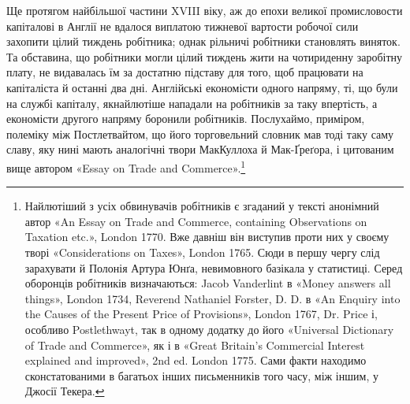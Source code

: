 Ще протягом найбільшої частини XVIII віку, аж до епохи
великої промисловости капіталові в Англії не вдалося виплатою
тижневої вартости робочої сили захопити цілий тиждень робітника;
однак рільничі робітники становлять виняток. Та обставина,
що робітники могли цілий тиждень жити на чотириденну
заробітну плату, не видавалась їм за достатню підставу для того,
щоб працювати на капіталіста й останні два дні. Англійські економісти
одного напряму, ті, що були на службі капіталу, якнайлютіше
нападали на робітників за таку впертість, а економісти
другого напряму боронили робітників. Послухаймо, приміром,
полеміку між Постлетвайтом, що його торговельний словник
мав тоді таку саму славу, яку нині мають аналогічні твори МакКуллоха
й Мак-Ґреґора, і цитованим вище автором «Essay
on Trade and Commerce».\footnote{
Найлютіший з усіх обвинувачів робітників є згаданий у тексті
анонімний автор «An Essay on Trade and Commerce, containing Observations
on Taxation etc.», London 1770. Вже давніш він виступив проти
них у своєму творі «Considerations on Taxes», London 1765. Сюди в
першу чергу слід зарахувати й Полонія Артура Юнґа, невимовного базікала
у статистиці. Серед оборонців робітників визначаються: Jacob Vanderlint
в «Money answers all things», London 1734, Reverend Nathaniel
Forster, D. D. в «An Enquiry into the Causes of the Present Price of Provisions»,
London 1767, Dr. Price і, особливо Postlethwayt, так в одному
додатку до його «Universal Dictionary of Trade and Commerce», як і в
«Great Britain’s Commercial Interest explained and improved», 2nd ed.
London 1775. Сами факти находимо сконстатованими в багатьох інших
письменників того часу, між іншим, у Джосії Текера.
}

